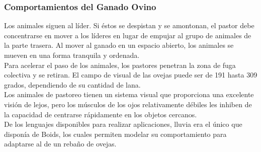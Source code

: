 \subsubsection{Comportamientos del Ganado Ovino}
\label{subsubsection:comportamientos}

Los animales siguen al líder. Si éstos se despistan y se amontonan, el pastor debe concentrarse en mover a los líderes en lugar de empujar 
al grupo de animales de la parte trasera. Al mover al ganado en un espacio abierto, los animales se mueven en una forma tranquila y ordenada.\\

Para acelerar el paso de los animales, los pastores penetran la zona de fuga colectiva y se retiran. El campo de visual de las ovejas puede 
ser de 191 hasta 309 grados, dependiendo de su cantidad de lana.\\

Los animales de pastoreo tienen un sistema visual que proporciona una excelente visión de lejos, pero los músculos de los ojos relativamente 
débiles les inhiben de la capacidad de centrarse rápidamente en los objetos cercanos.\\

De los lenguajes disponibles para realizar aplicaciones, lluvia era el único que disponía de Boids, los cuales permiten modelar su 
comportamiento para adaptarse al de un rebaño de ovejas.




